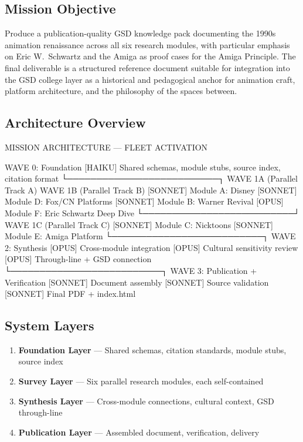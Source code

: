 \documentclass[11pt,letterpaper]{article}
\begin{document}
\subsection{Mission Objective}

Produce a publication-quality GSD knowledge pack documenting the 1990s animation renaissance across all six research modules, with particular emphasis on Eric W.\ Schwartz and the Amiga as proof cases for the Amiga Principle. The final deliverable is a structured reference document suitable for integration into the GSD college layer as a historical and pedagogical anchor for animation craft, platform architecture, and the philosophy of the spaces between.

\subsection{Architecture Overview}

\begin{asciibox}
MISSION ARCHITECTURE — FLEET ACTIVATION

WAVE 0: Foundation
  [HAIKU] Shared schemas, module stubs, source index, citation format
            └──────────────────────────┐
WAVE 1A (Parallel Track A)           WAVE 1B (Parallel Track B)
  [SONNET] Module A: Disney           [SONNET] Module D: Fox/CN Platforms
  [SONNET] Module B: Warner Revival   [OPUS]   Module F: Eric Schwartz Deep Dive
            └──────────────────────────┘
WAVE 1C (Parallel Track C)
  [SONNET] Module C: Nicktoons
  [SONNET] Module E: Amiga Platform
            └──────────────────────────┐
WAVE 2: Synthesis
  [OPUS] Cross-module integration
  [OPUS] Cultural sensitivity review
  [OPUS] Through-line + GSD connection
            └──────────────────────────┐
WAVE 3: Publication + Verification
  [SONNET] Document assembly
  [SONNET] Source validation
  [SONNET] Final PDF + index.html
\end{asciibox}

\subsection{System Layers}

\begin{enumerate}[leftmargin=2em]
  \item \textbf{Foundation Layer} --- Shared schemas, citation standards, module stubs, source index
  \item \textbf{Survey Layer} --- Six parallel research modules, each self-contained
  \item \textbf{Synthesis Layer} --- Cross-module connections, cultural context, GSD through-line
  \item \textbf{Publication Layer} --- Assembled document, verification, delivery
\end{enumerate}
\end{document}
